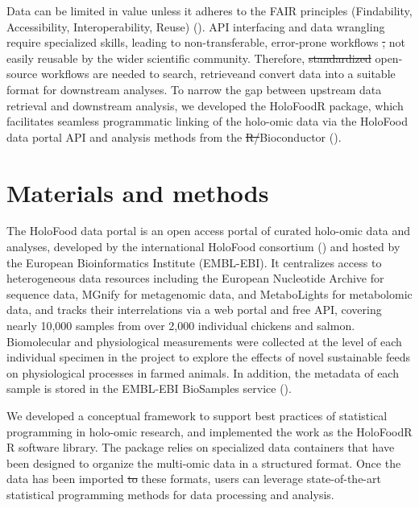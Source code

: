 \documentclass[unnumsec,webpdf,namedate,modern,large]{oup-authoring-template}%
\providecommand{\DIFaddtex}[1]{{\protect\color{blue}\uwave{#1}}} %
\providecommand{\DIFdeltex}[1]{{\protect\color{red}\sout{#1}}}                      %
\providecommand{\DIFaddbegin}{} %
\providecommand{\DIFaddend}{} %
\providecommand{\DIFdelbegin}{} %
\providecommand{\DIFdelend}{} %
\providecommand{\DIFadd}[1]{\texorpdfstring{\DIFaddtex{#1}}{#1}} %
\providecommand{\DIFdel}[1]{\texorpdfstring{\DIFdeltex{#1}}{}} %
\newcommand{\DIFscaledelfig}{0.5}
\newlength{\DIFdelgraphicswidth} %
\newlength{\DIFdelgraphicsheight} %
\newcommand{\DIFaddincludegraphics}[2][]{{\color{blue}\fbox{\DIFOincludegraphics[#1]{#2}}}} %
\newcommand{\DIFdelincludegraphics}[2][]{%
\sbox{\DIFdelgraphicsbox}{\DIFOincludegraphics[#1]{#2}}%
\settoboxwidth{\DIFdelgraphicswidth}{\DIFdelgraphicsbox} %
\settoboxtotalheight{\DIFdelgraphicsheight}{\DIFdelgraphicsbox} %
\scalebox{\DIFscaledelfig}{%
\parbox[b]{\DIFdelgraphicswidth}{\usebox{\DIFdelgraphicsbox}\\[-\baselineskip] \rule{\DIFdelgraphicswidth}{0em}}\llap{\resizebox{\DIFdelgraphicswidth}{\DIFdelgraphicsheight}{%
\setlength{\unitlength}{\DIFdelgraphicswidth}%
\begin{picture}(1,1)%
\thicklines\linethickness{2pt} %
{\color[rgb]{1,0,0}\put(0,0){\framebox(1,1){}}}%
{\color[rgb]{1,0,0}\put(0,0){\line( 1,1){1}}}%
{\color[rgb]{1,0,0}\put(0,1){\line(1,-1){1}}}%
\end{picture}%
}\hspace*{3pt}}} %
} %
\DeclareRobustCommand{\DIFaddbegin}{\DIFOaddbegin \let\includegraphics\DIFaddincludegraphics} %
\DeclareRobustCommand{\DIFaddend}{\DIFOaddend \let\includegraphics\DIFOincludegraphics} %
\DeclareRobustCommand{\DIFdelbegin}{\DIFOdelbegin \let\includegraphics\DIFdelincludegraphics} %
\DeclareRobustCommand{\DIFdelend}{\DIFOaddend \let\includegraphics\DIFOincludegraphics} %
\begin{document}
Data can be limited in value unless it adheres to the FAIR principles (Findability, Accessibility, Interoperability, Reuse) (\cite{wilkinsonFAIRGuidingPrinciples2016}). API interfacing and data wrangling require specialized skills, leading to non-transferable, error-prone workflows \DIFdelbegin \DIFdel{, }\DIFdelend not easily reusable by the wider scientific community. Therefore, \DIFdelbegin \DIFdel{standardized }\DIFdelend \DIFaddbegin \DIFadd{standardised }\DIFaddend open-source workflows are needed to search, retrieve\DIFaddbegin \DIFadd{, }\DIFaddend and convert data into a suitable format for downstream analyses.
To narrow the gap between upstream data retrieval and downstream analysis, we developed the HoloFoodR package, which facilitates seamless programmatic linking of the holo-omic data via the HoloFood data portal API and analysis methods from the \DIFdelbegin \DIFdel{R/}\DIFdelend Bioconductor  (\cite{gentleman_bioconductor_2004,callahan_bioconductor_2016}).

\section{Materials and methods}

The HoloFood data portal is an open access portal of curated holo-omic data and analyses, developed by the international HoloFood consortium (\cite{rogers_holofood_2025}) and hosted by the European Bioinformatics Institute (EMBL-EBI). It centralizes access to heterogeneous data resources including the European Nucleotide Archive for sequence data, MGnify for metagenomic data, and MetaboLights for metabolomic data, and tracks their interrelations via a web portal and free API, covering nearly 10,000 samples from over 2,000 individual chickens and salmon. Biomolecular and physiological measurements were collected at the level of each individual specimen in the project to explore the effects of novel sustainable feeds on physiological processes in farmed animals. In addition, the metadata of each sample is stored in the EMBL-EBI BioSamples service (\cite{courtot_2018}).

We developed a conceptual framework to support best practices of statistical programming in holo-omic research, and implemented the work as the HoloFoodR R software library. The package relies on specialized data containers that have been designed to organize the multi-omic data in a structured format. Once the data has been imported \DIFdelbegin \DIFdel{to }\DIFdelend \DIFaddbegin \DIFadd{into }\DIFaddend these formats, users can leverage state-of-the-art statistical programming methods for data processing and analysis.
\end{document}
